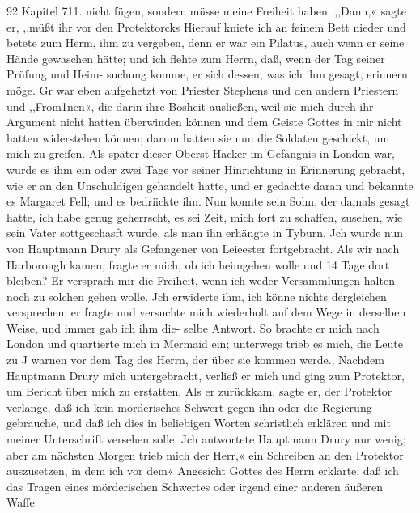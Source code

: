 92 Kapitel 711.
nicht fügen, sondern müsse meine Freiheit haben. ,,Dann,« sagte
er, ,,müßt ihr vor den Protektorcks Hierauf kniete ich an feinem
Bett nieder und betete zum Herm, ihm zu vergeben, denn er war
ein Pilatus, auch wenn er seine Hände gewaschen hätte; und ich
flehte zum Herrn, daß, wenn der Tag seiner Prüfung und Heim-
suchung komme, er sich dessen, was ich ihm gesagt, erinnern möge.
Gr war eben aufgehetzt von Priester Stephens und den andern
Priestern und ,,From1nen«, die darin ihre Bosheit ausließen, weil
sie mich durch ihr Argument nicht hatten überwinden können
und dem Geiste Gottes in mir nicht hatten widerstehen können;
darum hatten sie nun die Soldaten geschickt, um mich zu greifen.
Als später dieser Oberst Hacker im Gefängnis in London
war, wurde es ihm ein oder zwei Tage vor seiner Hinrichtung
in Erinnerung gebracht, wie er an den Unschuldigen gehandelt
hatte, und er gedachte daran und bekannte es Margaret Fell;
und es bedriickte ihn. Nun konnte sein Sohn, der damals
gesagt hatte, ich habe genug geherrscht, es sei Zeit, mich fort zu
schaffen, zusehen, wie sein Vater sottgeschasft wurde, als man ihn
erhängte in Tyburn.
Jch wurde nun von Hauptmann Drury als Gefangener von
Leieester fortgebracht. Als wir nach Harborough kamen, fragte
er mich, ob ich heimgehen wolle und 14 Tage dort bleiben? Er
versprach mir die Freiheit, wenn ich weder Versammlungen halten
noch zu solchen gehen wolle. Jch erwiderte ihm, ich könne nichts
dergleichen versprechen; er fragte und versuchte mich wiederholt
auf dem Wege in derselben Weise, und immer gab ich ihm die-
selbe Antwort. So brachte er mich nach London und quartierte
mich in Mermaid ein; unterwegs trieb es mich, die Leute zu J
warnen vor dem Tag des Herrn, der über sie kommen werde.,
Nachdem Hauptmann Drury mich untergebracht, verließ er mich
und ging zum Protektor, um Bericht über mich zu erstatten. Als
er zurückkam, sagte er, der Protektor verlange, daß ich kein
mörderisches Schwert gegen ihn oder die Regierung gebrauche,
und daß ich dies in beliebigen Worten schristlich erklären und mit
meiner Unterschrift versehen solle. Jch antwortete Hauptmann
Drury nur wenig; aber am nächsten Morgen trieb mich der Herr,«
ein Schreiben an den Protektor auszusetzen, in dem ich vor dem«
Angesicht Gottes des Herrn erklärte, daß ich das Tragen eines
mörderischen Schwertes oder irgend einer anderen äußeren Waffe


